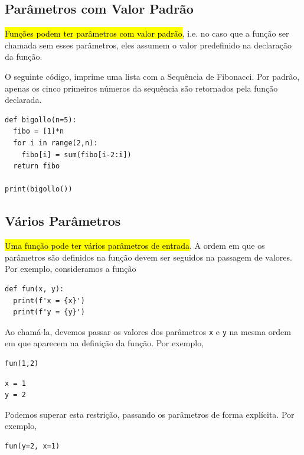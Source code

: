 \subsection{Parâmetros com Valor Padrão}

\hl{Funções podem ter parâmetros com valor padrão}, i.e. no caso que a função ser chamada sem esses parâmetros, eles assumem o valor predefinido na declaração da função.

\begin{ex}
  O seguinte código, imprime uma lista com a Sequência de Fibonacci{\fibonacci}. Por padrão, apenas os cinco primeiros números da sequência são retornados pela função declarada.

\begin{lstlisting}
def bigollo(n=5):
  fibo = [1]*n
  for i in range(2,n):
    fibo[i] = sum(fibo[i-2:i])
  return fibo

print(bigollo())
\end{lstlisting}

\end{ex}

\subsection{Vários Parâmetros}

\hl{Uma função pode ter vários parâmetros de entrada}. A ordem em que os parâmetros são definidos na função devem ser seguidos na passagem de valores. Por exemplo, consideramos a função

\begin{lstlisting}
def fun(x, y):
  print(f'x = {x}')
  print(f'y = {y}')
\end{lstlisting}

Ao chamá-la, devemos passar os valores dos parâmetros \lstinline+x+ e \lstinline+y+ na mesma ordem em que aparecem na definição da função. Por exemplo,

\begin{lstlisting}
fun(1,2)
\end{lstlisting}

\begin{verbatim}
x = 1
y = 2
\end{verbatim}

Podemos superar esta restrição, passando os parâmetros de forma explícita. Por exemplo,

\begin{lstlisting}
fun(y=2, x=1)
\end{lstlisting}

